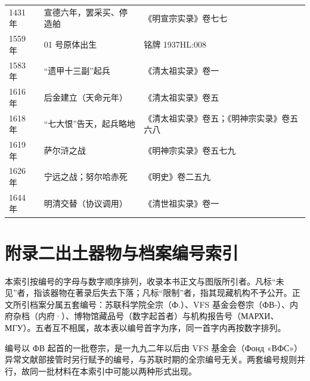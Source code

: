 {\begin{longtable}{@{}p{31mm}p{55mm}p{45mm}@{}}
1431 年 & 宣德六年，罢采买、停造舶 & 《明宣宗实录》卷七七\\
1559 年 & 01 号原体出生 & 铭牌 1937HL:008\\
1583 年 & “遗甲十三副”起兵 & 《清太祖实录》卷一\\
1616 年 & 后金建立（天命元年） & 《清太祖实录》卷五\\
1618 年 & “七大恨”告天，起兵略地 & 《清太祖实录》卷五；《明神宗实录》卷五六八\\
1619 年 & 萨尔浒之战 & 《明神宗实录》卷五七九\\
1626 年 & 宁远之战；努尔哈赤死 & 《明史》卷二五九\\
1644 年 & 明清交替（协议调用） & 《清世祖实录》卷一\\
\end{longtable}
}

\clearpage
\chapter*{附录二\quad 出土器物与档案编号索引}

本索引按编号的字母与数字顺序排列，收录本书正文与图版所引者。凡标“未见”者，指该器物在著录后失去下落；凡标“限制”者，指其现藏机构不予公开。正文所引档案分属五套编号：苏联科学院全宗（Ф.）、VFS 基金会卷宗（ФВ-）、内府杂档（内府·）、博物馆藏品号（数字起首者）与机构报告号（МАРХИ、МГУ）。五者互不相属，故本表以编号首字为序，同一首字内再按数字排列。

编号以 ФВ 起首的一批卷宗，是一九九二年以后由 VFS 基金会（Фонд «ВФС»）异常文献部接管时另行赋予的编号，与苏联时期的全宗编号无关。两套编号规则并行，故同一批材料在本索引中可能以两种形式出现。

